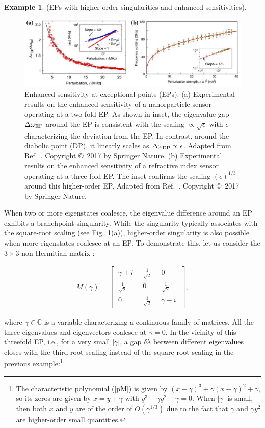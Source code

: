 \documentclass{tADP2e}
\theoremstyle{plain}
\newcommand{\eqn}[1]{
\begin{eqnarray}
	#1
\end{eqnarray}
}
\theoremstyle{plain}
\theoremstyle{definition}
\newtheorem{example}{Example}[section]
\newcommand{\exmp}[1]{
\begin{example}
	#1
\end{example}
}
\begin{document}
\exmp{(EPs with higher-order singularities and enhanced sensitivities). 
\begin{figure}
\begin{center}
\includegraphics[width=13.5cm]{./Figures/fig_2_enhanced_sensitivity.pdf}
\end{center}
\caption{Enhanced sensitivity at exceptional points (EPs). (a) Experimental results on the enhanced sensitivity of a nanorparticle sensor operating at a two-fold EP. As shown in inset, the eigenvalue gap $\Delta\omega_{\rm EP}$ around the EP is consistent with the scaling $\propto\sqrt{\epsilon}$ with $\epsilon$ characterizing the deviation from the EP. In contrast, around the diabolic point (DP), it linearly scales as $\Delta\omega_{\rm DP}\propto \epsilon$. Adapted from Ref.~\cite{CW17}. Copyright \copyright\,   2017 by Springer Nature. (b) Experimental results on the enhanced sensitivity of a refractive index sensor operating at a three-fold EP. The inset confirms the scaling $(\epsilon)^{1/3}$ around this higher-order EP.  
Adapted from Ref.~\cite{HH17}. Copyright \copyright\,   2017 by Springer Nature.
}
\label{fig:2enhanced}
\end{figure}
When  two or more eigenstates coalesce, the eigenvalue difference around an EP exhibits a branchpoint singularity. While the singularity typically associates with the square-root scaling (see Fig.~\ref{fig:2enhanced}(a)), higher-order singularity is also possible when more eigenstates coalesce at an EP.  To demonstrate this, let us consider the $3\times 3$ non-Hermitian matrix \cite{Demange_2011}:
\eqn{\label{3b3nh}
M(\gamma)=
\begin{bmatrix}
\;\gamma+i\; & \;\frac{1}{\sqrt{2}}\; & \;0\; \\
\;\frac{1}{\sqrt{2}}\; & \;0\; & \;\frac{1}{\sqrt{2}}\; \\
\;0\; & \;\frac{1}{\sqrt{2}}\; & \;\gamma-i\; 
\end{bmatrix},
} 
where $\gamma\in\mathbb{C}$  is a variable characterizing a continuous family of matrices. All the three eigenvalues and eigenvectors coalesce at $\gamma=0$.  
In the vicinity of this threefold EP, i.e., for a very small $|\gamma|$, a gap $\delta\lambda$ between different eigenvalues closes with the third-root scaling instead of the square-root scaling in the previous example:\footnote{The characteristic polynomial (\ref{pM}) is given by $(x-\gamma)^3+\gamma(x-\gamma)^2+\gamma$, so its zeros are given by $x=y+\gamma$ with $y^3+\gamma y^2+\gamma=0$. When $|\gamma|$ is small, then both $x$ and $y$ are of the order of $O(\gamma^{1/3})$ due to the fact that $\gamma$ and $\gamma y^2$ are higher-order small quantities. }
}
\end{document}
